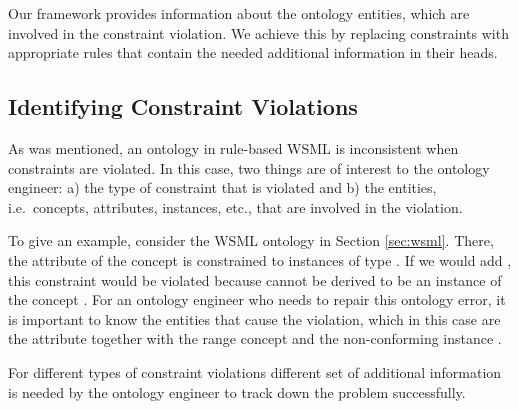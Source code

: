 Our framework provides information about the ontology entities, which are involved in the constraint violation. We achieve this by replacing constraints with appropriate rules that contain the needed additional information in their heads.

\subsection{Identifying Constraint Violations}

As was mentioned, an ontology in rule-based WSML is inconsistent when constraints
are violated. In this case, two
things are of interest to the ontology engineer: a) the type of
constraint that is violated and b) the entities, i.e.\ concepts,
attributes, instances, etc., that are involved in the violation.

To give an example, consider the WSML ontology in Section
\ref{sec:wsml}. There, the attribute \bla of the concept \bla is
constrained to instances of type \bla. If we would add \bla, this
constraint would be violated because \bla cannot be derived to be
an instance of the concept \bla. For an ontology engineer who
needs to repair this ontology error, it is important to know the
entities that cause the violation, which in this case are the
attribute \bla together with the range concept \bla and the
non-conforming instance \bla.

For different types of constraint violations different set of additional information is needed by the ontology engineer to track down the problem successfully.

